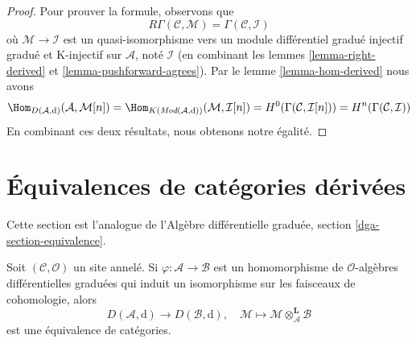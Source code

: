 \begin{proof}
Pour prouver la formule, observons que
$$
R\Gamma(\mathcal{C}, \mathcal{M}) = \Gamma(\mathcal{C}, \mathcal{I})
$$ où
$\mathcal{M} \to \mathcal{I}$ est un quasi-isomorphisme vers un
module différentiel gradué injectif gradué et K-injectif sur
$\mathcal{A}$, noté $\mathcal{I}$ (en combinant
les lemmes \ref{lemma-right-derived} et \ref{lemma-pushforward-agrees}).
Par le lemme \ref{lemma-hom-derived} nous
avons $$
\Hom_{D(\mathcal{A}, \text{d})}(\mathcal{A}, \mathcal{M}[n])
= \Hom_{K(\textit{Mod}(\mathcal{A}, \text{d}))}(\mathcal{M}, \mathcal{I}[n]) =
H^0(\Gamma(\mathcal{C}, \mathcal{I}[n])) =
H^n(\Gamma(\mathcal{C}, \mathcal{I}))
$$ En
combinant ces deux résultats, nous obtenons notre égalité.
\end{proof}








\section{Équivalences de catégories dérivées}
\label{section-equivalence}

\noindent
Cette section est l'analogue de
l'Algèbre différentielle graduée, section \ref{dga-section-equivalence}.

\begin{lemma}
\label{lemma-qis-equivalence}
Soit $(\mathcal{C}, \mathcal{O})$ un site annelé. Si
$\varphi : \mathcal{A} \to \mathcal{B}$ est un homomorphisme de
$\mathcal{O}$-algèbres différentielles graduées qui induit un isomorphisme
sur les faisceaux de cohomologie,
alors $$
D(\mathcal{A}, \text{d}) \longrightarrow D(\mathcal{B}, \text{d}), \quad
\mathcal{M}
\longmapsto
\mathcal{M} \otimes_\mathcal{A}^\mathbf{L} \mathcal{B}
$$
est une équivalence de catégories.
\end{lemma}

